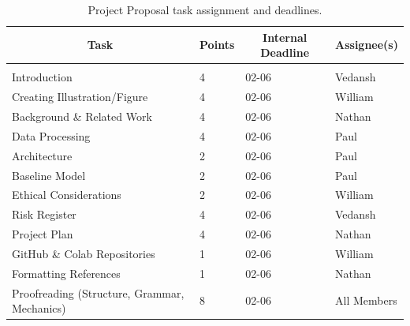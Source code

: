 \documentclass{article} %
\begin{document}
    \begin{table}[t]
    \caption{Project Proposal task assignment and deadlines.}
    \label{project_proposal_table}
    \begin{center}
    \begin{tabular}{llll}
    \multicolumn{1}{c}{\bf Task}                    & \multicolumn{1}{c}{\bf Points} & \multicolumn{1}{c}{\bf Internal Deadline} & \multicolumn{1}{c}{\bf Assignee(s)}
    \\ \hline \\
    Introduction                                    & 4                              & 02-06                                     & Vedansh \\
    Creating Illustration/Figure                    & 4                              & 02-06                                     & William \\
    Background \& Related Work                      & 4                              & 02-06                                     & Nathan \\
    Data Processing                                 & 4                              & 02-06                                     & Paul \\
    Architecture                                    & 2                              & 02-06                                     & Paul \\
    Baseline Model                                  & 2                              & 02-06                                     & Paul \\
    Ethical Considerations                          & 2                              & 02-06                                     & William \\
    Risk Register                                   & 4                              & 02-06                                     & Vedansh \\
    Project Plan                                    & 4                              & 02-06                                     & Nathan \\
    GitHub \& Colab Repositories                    & 1                              & 02-06                                     & William \\
    Formatting References                           & 1                              & 02-06                                     & Nathan \\
    Proofreading (Structure, Grammar, Mechanics)    & 8                              & 02-06                                     & All Members \\
    \end{tabular}
    \end{center}
    \end{table}
\end{document}

